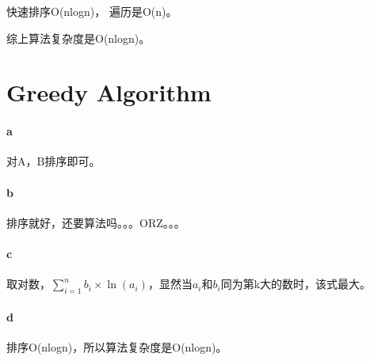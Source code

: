 \documentclass{article}
\begin{document}
			快速排序O(nlogn)， 遍历是O(n)。
			
			综上算法复杂度是O(nlogn)。
		
	\color{myorange} \section{Greedy Algorithm} \color{black}
		\paragraph{a}对A，B排序即可。
		
		\paragraph{b}排序就好，还要算法吗。。。ORZ。。。
	
		\paragraph{c}取对数，$\sum\limits_{i = 1}^n {{b_i} \times \ln ({a_i})}$，显然当${a_i}$和${b_i}$同为第k大的数时，该式最大。
		
		\paragraph{d}排序O(nlogn)，所以算法复杂度是O(nlogn)。
			
\end{document}
